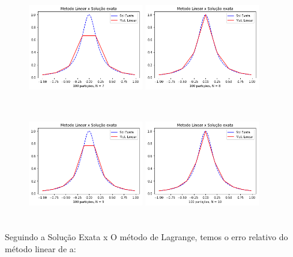 \documentclass{article}
\begin{document}
\begin{figure}[!htb]
\includegraphics [width=5cm,height=5cm]{LSEa7.png}
\includegraphics [width=5cm,height=5cm]{LSEa8.png}
\includegraphics [width=5cm,height=5cm]{LSEa9.png}
\includegraphics [width=5cm,height=5cm]{LSEa10.png}
\end{figure}

\newpage

\text Seguindo a Solução Exata x O método de Lagrange, temos o erro relativo do método linear de a:
\end{document}
